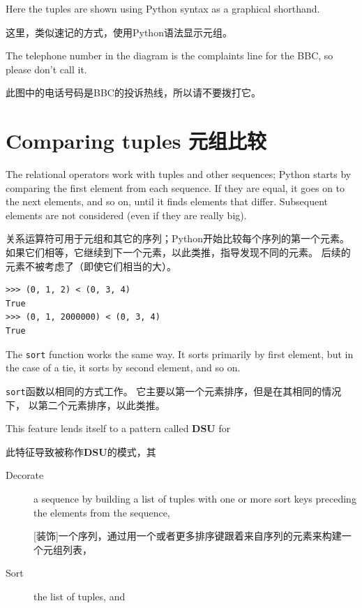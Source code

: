 \documentclass[10pt]{book}
\begin{document}
\begin{CJK}{UTF8}{gbsn}
Here the tuples are shown using Python syntax as a graphical
shorthand.

这里，类似速记的方式，使用Python语法显示元组。

The telephone number in the diagram is the complaints line for the
BBC, so please don't call it.

此图中的电话号码是BBC的投诉热线，所以请不要拨打它。



\section{Comparing tuples 元组比较}

The relational operators work with tuples and other sequences;
Python starts by comparing the first element from each
sequence.  If they are equal, it goes on to the next elements,
and so on, until it finds elements that differ.  Subsequent
elements are not considered (even if they are really big).

关系运算符可用于元组和其它的序列；Python开始比较每个序列的第一个元素。
如果它们相等，它继续到下一个元素，以此类推，指导发现不同的元素。
后续的元素不被考虑了（即使它们相当的大）。

\begin{verbatim}
>>> (0, 1, 2) < (0, 3, 4)
True
>>> (0, 1, 2000000) < (0, 3, 4)
True
\end{verbatim}
%
The {\tt sort} function works the same way.  It sorts 
primarily by first element, but in the case of a tie, it sorts
by second element, and so on.  

{\tt sort}函数以相同的方式工作。
它主要以第一个元素排序，但是在其相同的情况下，
以第二个元素排序，以此类推。

This feature lends itself to a pattern called {\bf DSU} for 

此特征导致被称作{\bf DSU}的模式，其

\begin{description}

\item[Decorate] a sequence by building a list of tuples
with one or more sort keys preceding the elements from the sequence,

[装饰]一个序列，通过用一个或者更多排序键跟着来自序列的元素来构建一个元组列表，

\item[Sort] the list of tuples, and


\end{description}
\end{CJK}
\end{document}
